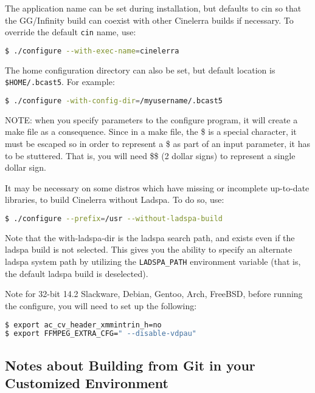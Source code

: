 The application name can be set during installation, but defaults to cin so that the GG/Infinity build can coexist with other Cinelerra builds if necessary.  To override the default \texttt{cin} name, use:	
\begin{lstlisting}[language=bash,numbers=none]
$ ./configure --with-exec-name=cinelerra
\end{lstlisting}

The home configuration directory can also be set, but default location is \texttt{\$HOME/.bcast5}.  
For example:

\begin{lstlisting}[language=bash,numbers=none]
$ ./configure -with-config-dir=/myusername/.bcast5
\end{lstlisting}

NOTE:  when you specify parameters to the configure program, it will create a make file as a consequence.  
Since in a make file, the \$ is a special character, it must be escaped so in order to represent a \$ as part of an input parameter, it has to be stuttered.  
That is, you will need \$\$ (2 dollar signs) to represent a single dollar sign. 

It may be necessary on some distros which have missing or incomplete up-to-date libraries, to build Cinelerra without Ladspa.  
To do so, use:

\begin{lstlisting}[language=bash,numbers=none]
$ ./configure --prefix=/usr --without-ladspa-build
\end{lstlisting}

Note that the with-ladspa-dir is the ladspa search path, and exists even if the ladspa build is not selected.  This gives you the ability to specify an alternate ladspa system path by utilizing the \texttt{LADSPA\_PATH} environment variable (that is, the default ladspa build is deselected).

Note for 32-bit 14.2 Slackware, Debian, Gentoo, Arch, FreeBSD, before running the configure, you will need to set up the following:

\begin{lstlisting}[language=bash,numbers=none]
$ export ac_cv_header_xmmintrin_h=no
$ export FFMPEG_EXTRA_CFG=" --disable-vdpau"
\end{lstlisting}

\subsection{Notes about Building from Git in your Customized Environment}%
\label{sub:notes_about_building_from_git_in_your_customized_environment}

